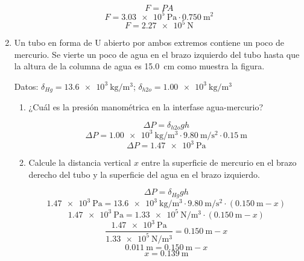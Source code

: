 \documentclass[../practica.root.tex]{subfiles}
\begin{document}
\begin{enumerate}
	      \[F=PA\]
	      \[F=\SI{3,03e5}{\pascal}\cdot\SI{0,750}{\meter\squared}\]
	      \[F=\boxed{\SI{2,27e5}{\newton}}\]

	      \newpage

	\item Un tubo en forma de U abierto por ambos extremos contiene un poco de mercurio. Se vierte un poco de agua en el brazo izquierdo del tubo hasta que la altura de la columna de agua es \SI{15,0}{\cm} como muestra la figura.

	      Datos: $\delta_{Hg}=\SI{13,6e3}{\kilogram\per\meter\cubed}$; $\delta_{h2o}=\SI{1,00e3}{\kilogram\per\meter\cubed}$

	      \begin{center}
	      \end{center}

	      \begin{enumerate}
		      \item ¿Cuál es la presión manométrica en la interfase agua-mercurio?

		            \[\Delta P=\delta_{h2o}gh\]
		            \[\Delta P=\SI{1,00e3}{\kilogram\per\meter\cubed}\cdot\SI{9,80}{\meter\per\second\squared}\cdot\SI{0,15}{\meter}\]
		            \[\Delta P=\boxed{\SI{1,47e3}{\pascal}}\]

		      \item Calcule la distancia vertical $x$ entre la superficie de mercurio en el brazo derecho del tubo y la superficie del agua en el brazo izquierdo.

		            \[\Delta P=\delta_{Hg}gh\]
		            \[\SI{1,47e3}{\pascal}=\SI{13,6e3}{\kilogram\per\meter\cubed}\cdot\SI{9,80}{\meter\per\second\squared}\cdot(\SI{0,150}{\meter}-x)\]
		            \[\SI{1,47e3}{\pascal}=\SI{1,33e5}{\newton\per\meter\cubed}\cdot(\SI{0,150}{\meter}-x)\]
		            \[\frac{\SI{1,47e3}{\pascal}}{\SI{1,33e5}{\newton\per\meter\cubed}}=\SI{0,150}{\meter}-x\]
		            \[\SI{0,011}{\meter}=\SI{0,150}{\meter}-x\]
		            \[x=\boxed{\SI{0,139}{\meter}}\]
	      \end{enumerate}


\end{enumerate}
\end{document}
